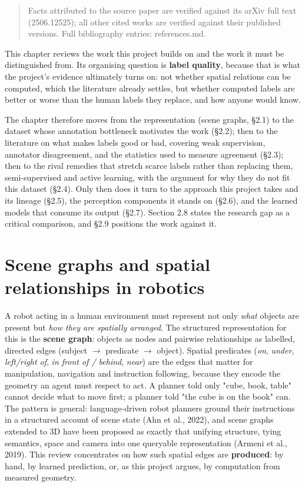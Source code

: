 
\begin{quote}
Facts attributed to the source paper are verified against its arXiv full text (2506.12525); all other cited works are verified against their published versions. Full bibliography entries: references.md.
\end{quote}

This chapter reviews the work this project builds on and the work it must be distinguished from. Its organising question is \textbf{label quality}, because that is what the project's evidence ultimately turns on: not whether spatial relations can be computed, which the literature already settles, but whether computed labels are better or worse than the human labels they replace, and how anyone would know.

The chapter therefore moves from the representation (scene graphs, \S2.1) to the dataset whose annotation bottleneck motivates the work (\S2.2); then to the literature on what makes labels good or bad, covering weak supervision, annotator disagreement, and the statistics used to measure agreement (\S2.3); then to the rival remedies that stretch scarce labels rather than replacing them, semi-supervised and active learning, with the argument for why they do not fit this dataset (\S2.4). Only then does it turn to the approach this project takes and its lineage (\S2.5), the perception components it stands on (\S2.6), and the learned models that consume its output (\S2.7). Section 2.8 states the research gap as a critical comparison, and \S2.9 positions the work against it.

\section{Scene graphs and spatial relationships in robotics}

A robot acting in a human environment must represent not only \textit{what} objects are present but \textit{how they are spatially arranged}. The structured representation for this is the \textbf{scene graph}: objects as nodes and pairwise relationships as labelled, directed edges (subject $\rightarrow$ predicate $\rightarrow$ object). Spatial predicates (\textit{on}, \textit{under}, \textit{left/right of}, \textit{in front of / behind}, \textit{near}) are the edges that matter for manipulation, navigation and instruction following, because they encode the geometry an agent must respect to act. A planner told only "cube, book, table" cannot decide what to move first; a planner told "the cube is on the book" can. The pattern is general: language-driven robot planners ground their instructions in a structured account of scene state (Ahn et al., 2022), and scene graphs extended to 3D have been proposed as exactly that unifying structure, tying semantics, space and camera into one queryable representation (Armeni et al., 2019). This review concentrates on how such spatial edges are \textbf{produced}: by hand, by learned prediction, or, as this project argues, by computation from measured geometry.


